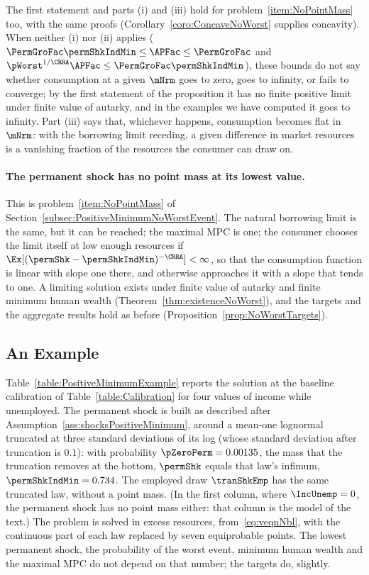 \documentclass[\econtexRoot/BufferStockTheory]{subfiles}
\begin{document}
The first statement and parts (i) and (iii) hold for problem~\ref{item:NoPointMass} too, with the same proofs (Corollary~\ref{coro:ConcaveNoWorst} supplies concavity).
When neither (i) nor (ii) applies ($\PermGroFac\permShkIndMin\leq\APFac\leq\PermGroFac$ and $\pWorst^{1/\CRRA}\APFac\leq\PermGroFac\permShkIndMin$), these bounds do not say whether consumption at a given $\mNrm$ goes to zero, goes to infinity, or fails to converge; by the first statement of the proposition it has no finite positive limit under finite value of autarky, and in the examples we have computed it goes to infinity.
Part (iii) says that, whichever happens, consumption becomes flat in $\mNrm$: with the borrowing limit receding, a given difference in market resources is a vanishing fraction of the resources the consumer can draw on.

\paragraph{The permanent shock has no point mass at its lowest value.}
This is problem~\ref{item:NoPointMass} of Section~\ref{subsec:PositiveMinimumNoWorstEvent}.
The natural borrowing limit is the same, but it can be reached; the maximal MPC is one; the consumer chooses the limit itself at low enough resources if $\Ex[(\permShk-\permShkIndMin)^{-\CRRA}]<\infty$, so that the consumption function is linear with slope one there, and otherwise approaches it with a slope that tends to one.
A limiting solution exists under finite value of autarky and finite minimum human wealth (Theorem~\ref{thm:existenceNoWorst}), and the targets and the aggregate results hold as before (Proposition~\ref{prop:NoWorstTargets}).

\subsection{An Example}\label{subsec:PositiveMinimumExample}

Table~\ref{table:PositiveMinimumExample} reports the solution at the baseline calibration of Table~\ref{table:Calibration} for four values of income while unemployed.
The permanent shock is built as described after Assumption~\ref{ass:shocksPositiveMinimum}, around a mean-one lognormal truncated at three standard deviations of its log (whose standard deviation after truncation is $0.1$): with probability $\pZeroPerm=0.00135$, the mass that the truncation removes at the bottom, $\permShk$ equals that law's infimum, $\permShkIndMin=0.734$.
The employed draw $\tranShkEmp$ has the same truncated law, without a point mass.
(In the first column, where $\IncUnemp=0$, the permanent shock has no point mass either: that column is the model of the text.)
The problem is solved in excess resources, from~\eqref{eq:veqnNbl}, with the continuous part of each law replaced by seven equiprobable points.
The lowest permanent shock, the probability of the worst event, minimum human wealth and the maximal MPC do not depend on that number; the targets do, slightly.
\end{document}
